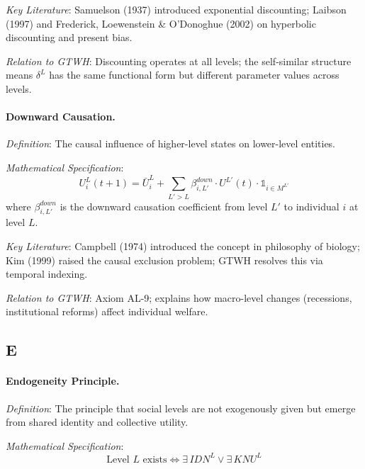 \documentclass[12pt,a4paper]{article}
\begin{document}
\textit{Key Literature}: Samuelson (1937) introduced exponential discounting; 
Laibson (1997) and Frederick, Loewenstein \& O'Donoghue (2002) on hyperbolic 
discounting and present bias.

\textit{Relation to GTWH}: Discounting operates at all levels; the self-similar 
structure means $\delta^L$ has the same functional form but different parameter 
values across levels.

\medskip

\paragraph{Downward Causation.}
\textit{Definition}: The causal influence of higher-level states on lower-level 
entities.

\textit{Mathematical Specification}:
\begin{equation}
U^L_i(t+1) = \bar{U}^L_i + \sum_{L' > L} \beta^{down}_{i,L'} \cdot U^{L'}(t) \cdot \mathbb{1}_{i \in M^{L'}}
\end{equation}
where $\beta^{down}_{i,L'}$ is the downward causation coefficient from level $L'$ 
to individual $i$ at level $L$.

\textit{Key Literature}: Campbell (1974) introduced the concept in philosophy of 
biology; Kim (1999) raised the causal exclusion problem; GTWH resolves this via 
temporal indexing.

\textit{Relation to GTWH}: Axiom AL-9; explains how macro-level changes 
(recessions, institutional reforms) affect individual welfare.

\subsection*{E}

\paragraph{Endogeneity Principle.}
\textit{Definition}: The principle that social levels are not exogenously given 
but emerge from shared identity and collective utility.

\textit{Mathematical Specification}:
\begin{equation}
\text{Level } L \text{ exists} \iff \exists \, IDN^L \lor \exists \, KNU^L
\end{equation}
\end{document}
